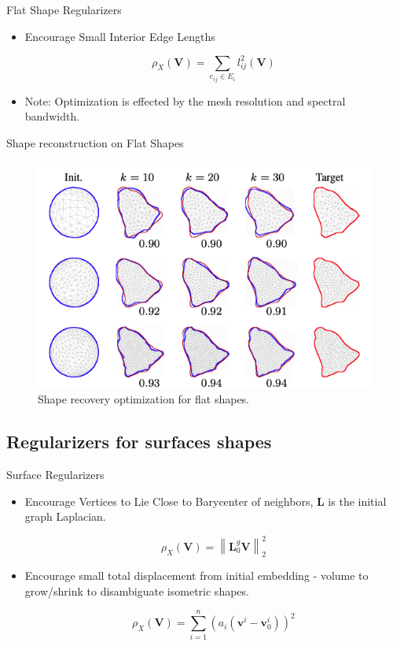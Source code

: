 \documentclass{beamer}
\begin{document}
\begin{frame}{Flat Shape Regularizers}

\begin{itemize}

    \item Encourage Small Interior Edge Lengths
    
    $$ \rho_{X}(\mathbf{V}) = \sum_{e_{ij} \in E_{i}} l_{ij}^2(\mathbf{V}) $$
    
    \item Note: Optimization is effected by the mesh resolution and spectral bandwidth.
    
\end{itemize}
    
\end{frame}

\begin{frame}{Shape reconstruction on Flat Shapes}

\begin{figure}
 \includegraphics[height=0.5\textwidth,keepaspectratio]{Flatshapes}
 \caption{\label{fig:Flatshapes} Shape recovery optimization for flat shapes.}
\end{figure}
    
\end{frame}


\subsection{Regularizers for surfaces shapes}

\begin{frame}{Surface Regularizers}

\begin{itemize}
    \item Encourage Vertices to Lie Close to Barycenter of neighbors, $ \mathbf{L} $ is the initial graph Laplacian.
    
    $$ \rho_{X}(\mathbf{V}) = \left\| \mathbf{L}_0^g \mathbf{V}  \right\|_{2}^{2} $$
    
    \item Encourage small total displacement from initial embedding - volume to grow/shrink to disambiguate isometric shapes.
    
    $$ \rho_{X}(\mathbf{V})=\sum_{i=1}^{n}\left(a_{i}\left(\mathbf{v}^{i}-\mathbf{v}_{0}^{i}\right)\right)^{2} $$
    
\end{itemize}
    
\end{frame}
\end{document}
